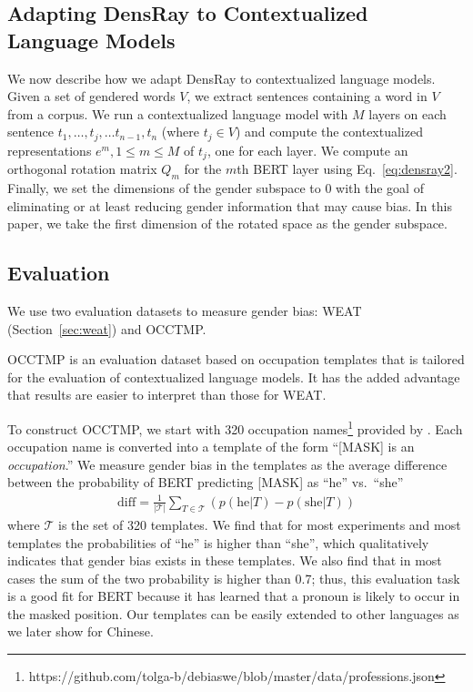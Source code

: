 \subsection{Adapting DensRay to Contextualized Language Models}
We now describe how we adapt DensRay to contextualized
language models. Given a set of gendered words
$V$, we extract sentences containing a word in $V$ from a
corpus. We run a contextualized language model
with $M$ layers
on each
sentence
$t_1,\ldots,t_j,\ldots t_{n-1},t_n$ (where $t_j \in V$)
and compute the contextualized representations $e^m, 1\leq m
\leq M$ of $t_j$, one for each layer. 
We compute an orthogonal rotation
matrix $Q_m$ for the $m$th BERT layer using Eq.\
\ref{eq:densray2}.
Finally, we set the dimensions
of the gender subspace to $0$ with the goal of eliminating
or at least reducing
gender
information that may cause bias. In this
paper, we take the first dimension of the rotated space as
the gender subspace.

\subsection{Evaluation}\label{sec:eval}
We use two evaluation datasets
to measure gender
bias: WEAT (Section~\ref{sec:weat}) and OCCTMP.

OCCTMP is an evaluation dataset
based on occupation templates
that
is tailored for 
the evaluation of contextualized language models.  It has
the added advantage that results are easier to interpret
than those for WEAT.

To construct OCCTMP,
we start with 
320 occupation
names\footnote{https://github.com/tolga-b/debiaswe/blob/master/data/professions.json}
provided by \citet{bolukbasi2016man}.
Each occupation name is converted into a template of the form
``[MASK] is an \textit{occupation}.''
We measure
gender bias
in the templates as the average difference
between the probability of BERT predicting [MASK] as ``he''
vs.\ ``she''
\begin{eqnarray}
    \text{diff}=\frac{1}{|{\mathcal T}|} \sum_{T \in
      {\mathcal T}}(p(\mbox{he}| T) - p(\mbox{she}|T))\nonumber
\end{eqnarray}
where $\mathcal T$ is the set of 320 templates.  We find
that for most experiments and most templates the probabilities
of ``he'' is higher than ``she'', which qualitatively
indicates that gender bias exists in these templates. We
also find that in most cases the sum of the two probability
is higher than 0.7; thus, this evaluation task is a good fit
for BERT because it has learned that a pronoun is likely to
occur in the masked position.
Our templates  can be easily extended to other
languages
as we later show for
Chinese.
